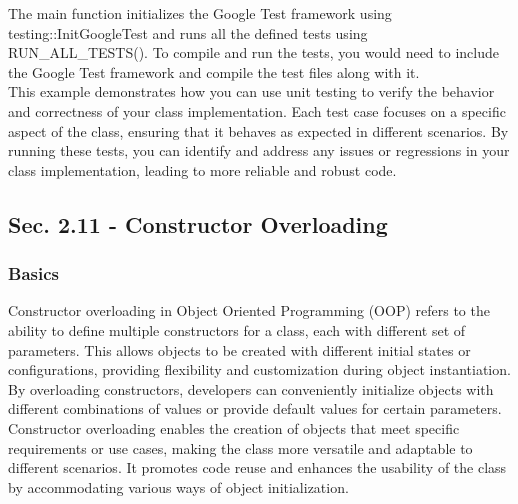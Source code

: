\begin{solution}
    \noindent The main function initializes the Google Test framework using testing::InitGoogleTest and runs all the defined tests using RUN\_ALL\_TESTS(). To compile and run the tests, you would need to include the Google Test framework and compile the test files along with it. \\

    \noindent This example demonstrates how you can use unit testing to verify the behavior and correctness of your class implementation. Each test case focuses on a specific aspect of the class, ensuring that it behaves as expected in different scenarios. By running these tests, you can 
    identify and address any issues or regressions in your class implementation, leading to more reliable and robust code. \\
\end{solution}

\subsection*{Sec. 2.11 - Constructor Overloading}
\subsubsection*{Basics}

Constructor overloading in Object Oriented Programming (OOP) refers to the ability to define multiple constructors for a class, each with different set of parameters. This allows objects to be created with different initial states or configurations, providing flexibility and customization 
during object instantiation. By overloading constructors, developers can conveniently initialize objects with different combinations of values or provide default values for certain parameters. Constructor overloading enables the creation of objects that meet specific requirements or use cases, 
making the class more versatile and adaptable to different scenarios. It promotes code reuse and enhances the usability of the class by accommodating various ways of object initialization. \\

